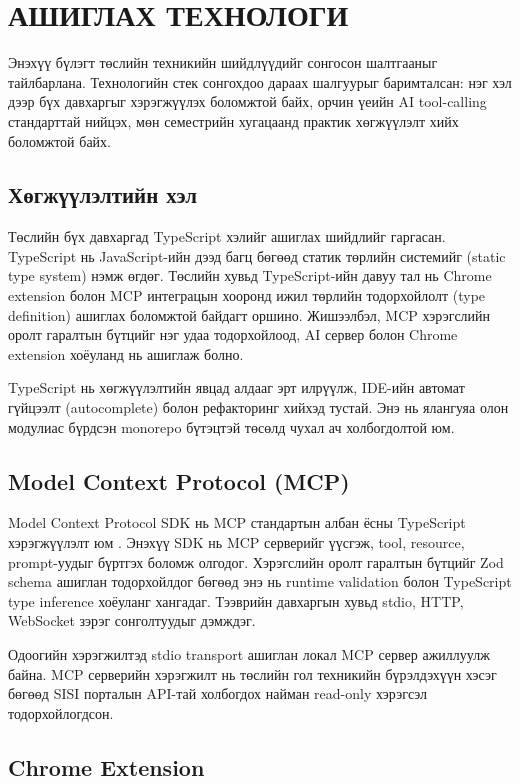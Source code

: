 \chapter{АШИГЛАХ ТЕХНОЛОГИ}

Энэхүү бүлэгт төслийн техникийн шийдлүүдийг сонгосон шалтгааныг тайлбарлана. Технологийн стек сонгохдоо дараах шалгуурыг баримталсан: нэг хэл дээр бүх давхаргыг хэрэгжүүлэх боломжтой байх, орчин үеийн AI tool-calling стандарттай нийцэх, мөн семестрийн хугацаанд практик хөгжүүлэлт хийх боломжтой байх.

\section{Хөгжүүлэлтийн хэл}

Төслийн бүх давхаргад TypeScript хэлийг ашиглах шийдлийг гаргасан. TypeScript нь JavaScript-ийн дээд багц бөгөөд статик төрлийн системийг (static type system) нэмж өгдөг. Төслийн хувьд TypeScript-ийн давуу тал нь Chrome extension болон MCP интеграцын хооронд ижил төрлийн тодорхойлолт (type definition) ашиглах боломжтой байдагт оршино. Жишээлбэл, MCP хэрэгслийн оролт гаралтын бүтцийг нэг удаа тодорхойлоод, AI сервер болон Chrome extension хоёуланд нь ашиглаж болно.

TypeScript нь хөгжүүлэлтийн явцад алдааг эрт илрүүлж, IDE-ийн автомат гүйцээлт (autocomplete) болон рефакторинг хийхэд тустай. Энэ нь ялангуяа олон модулиас бүрдсэн monorepo бүтэцтэй төсөлд чухал ач холбогдолтой юм.

\section{Model Context Protocol (MCP)}

Model Context Protocol SDK нь MCP стандартын албан ёсны TypeScript хэрэгжүүлэлт юм \cite{mcp-spec}. Энэхүү SDK нь MCP серверийг үүсгэж, tool, resource, prompt-уудыг бүртгэх боломж олгодог. Хэрэгслийн оролт гаралтын бүтцийг Zod schema ашиглан тодорхойлдог бөгөөд энэ нь runtime validation болон TypeScript type inference хоёуланг хангадаг. Тээврийн давхаргын хувьд stdio, HTTP, WebSocket зэрэг сонголтуудыг дэмждэг.

Одоогийн хэрэгжилтэд stdio transport ашиглан локал MCP сервер ажиллуулж байна. MCP серверийн хэрэгжилт нь төслийн гол техникийн бүрэлдэхүүн хэсэг бөгөөд SISI порталын API-тай холбогдох найман read-only хэрэгсэл тодорхойлогдсон.

\section{Chrome Extension}

